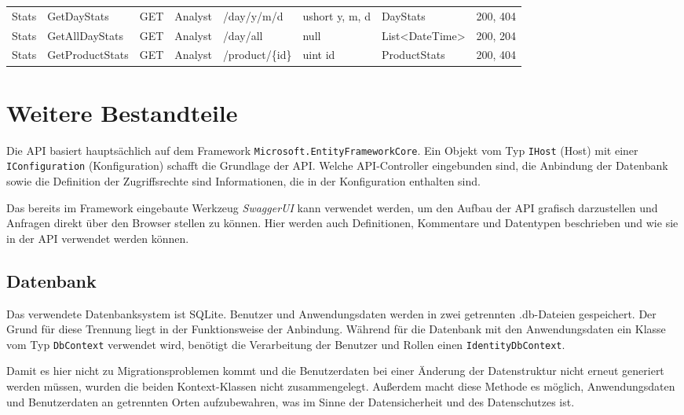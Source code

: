 \begin{table}
\begin{tabular}{llllllll}
	Stats      & GetDayStats      & GET     & Analyst & /day/y/m/d      & ushort y, m, d & DayStats                                & 200, 404    \\
	Stats      & GetAllDayStats   & GET     & Analyst & /day/all        & null           & List\textless{}DateTime\textgreater{}   & 200, 204    \\
	Stats      & GetProductStats  & GET     & Analyst & /product/\{id\} & uint id        & ProductStats                            & 200, 404   
\end{tabular}
\end{table}

\newpage
\section{Weitere Bestandteile}
Die API basiert hauptsächlich auf dem Framework \texttt{Microsoft.Entity\-Framework\-Core}.
Ein Objekt vom Typ \texttt{IHost} (Host) mit einer \texttt{IConfiguration} (Konfiguration) schafft die Grundlage der API.
Welche API-Controller eingebunden sind, die Anbindung der Datenbank sowie die Definition der Zugriffsrechte sind Informationen, die in der Konfiguration enthalten sind.

Das bereits im Framework eingebaute Werkzeug \emph{SwaggerUI} kann verwendet werden, um den Aufbau der API grafisch darzustellen und Anfragen direkt über den Browser stellen zu können.
Hier werden auch Definitionen, Kommentare und Datentypen beschrieben und wie sie in der API verwendet werden können.

\subsection{Datenbank}
Das verwendete Datenbanksystem ist SQLite.
Benutzer und Anwendungsdaten werden in zwei getrennten .db-Dateien gespeichert.
Der Grund für diese Trennung liegt in der Funktionsweise der Anbindung.
Während für die Datenbank mit den Anwendungsdaten ein Klasse vom Typ \texttt{DbContext} verwendet wird, benötigt die Verarbeitung der Benutzer und Rollen einen \texttt{IdentityDbContext}.

Damit es hier nicht zu Migrationsproblemen kommt und die Benutzerdaten bei einer Änderung der Datenstruktur nicht erneut generiert werden müssen, wurden die beiden Kontext-Klassen nicht zusammengelegt.
Außerdem macht diese Methode es möglich, Anwendungsdaten und Benutzerdaten an getrennten Orten aufzubewahren, was im Sinne der Datensicherheit und des Datenschutzes ist.

